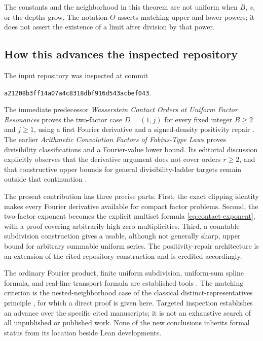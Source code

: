 \documentclass[11pt,letterpaper]{article}
\theoremstyle{definition}
\theoremstyle{remark}
\begin{document}
The constants and the neighborhood in this theorem are not uniform when $B$, $s$, or the depths grow. The notation $\Theta$ asserts matching upper and lower powers; it does not assert the existence of a limit after division by that power.

\subsection{How this advances the inspected repository}
The input repository was inspected at commit
\begin{center}
\small\texttt{a21208b3ff14a07a4c8318dbf916d543acbef043}.
\end{center}
The immediate predecessor \emph{Wasserstein Contact Orders at Uniform Factor Resonances} proves the two-factor case $D=(1,j)$ for every fixed integer $B\ge2$ and $j\ge1$, using a first Fourier derivative and a signed-density positivity repair \cite{repo-contact}. The earlier \emph{Arithmetic Convolution Factors of Fabius-Type Laws} proves divisibility classifications and a Fourier-value lower bound. Its editorial discussion explicitly observes that the derivative argument does not cover orders $r\ge2$, and that constructive upper bounds for general divisibility-ladder targets remain outside that continuation \cite{repo-arithmetic}.

The present contribution has three precise parts. First, the exact clipping identity makes every Fourier derivative available for compact factor problems. Second, the two-factor exponent becomes the explicit multiset formula \eqref{eq:contact-exponent}, with a proof covering arbitrarily high zero multiplicities. Third, a countable subdivision construction gives a usable, although not generally sharp, upper bound for arbitrary summable uniform series. The positivity-repair architecture is an extension of the cited repository construction and is credited accordingly.

The ordinary Fourier product, finite uniform subdivision, uniform-sum spline formula, and real-line transport formula are established tools \cite{Arias,BradleyGupta,Vallender}. The matching criterion is the nested-neighborhood case of the classical distinct-representatives principle \cite{Hall}, for which a direct proof is given here. Targeted inspection establishes an advance over the specific cited manuscripts; it is not an exhaustive search of all unpublished or published work. None of the new conclusions inherits formal status from its location beside Lean developments.
\end{document}
